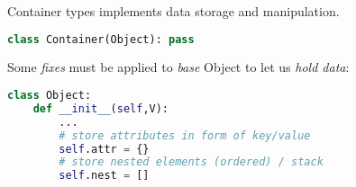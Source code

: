 \secdown

Container types implements data storage and manipulation.

\begin{lstlisting}[language=Python]
class Container(Object): pass
\end{lstlisting}

\noindent
Some \emph{fixes} must be applied to \emph{base} Object to let us \emph{hold
data}:

\begin{lstlisting}[language=Python]
class Object:
	def __init__(self,V):
		...
		# store attributes in form of key/value
		self.attr = {}
		# store nested elements (ordered) / stack
		self.nest = []
\end{lstlisting}




\secup
